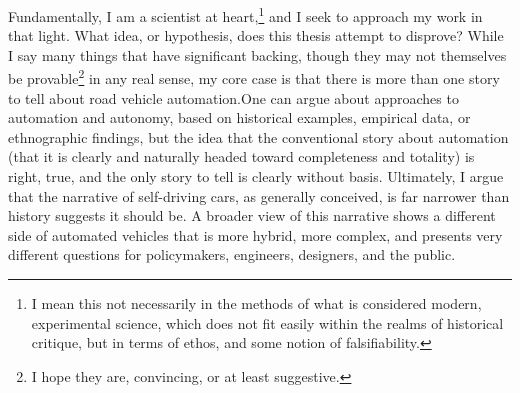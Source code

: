 Fundamentally, I am a scientist at heart,\footnote{I mean this not necessarily in
  the methods of what is considered modern, experimental science,
  which does not fit easily within the realms of historical critique,
  but in terms of ethos, and some notion of falsifiability.} and I seek to approach my
work in that light. What idea, or hypothesis, does this thesis attempt
to disprove? While I say many things that have significant backing,
though they may not themselves be provable\footnote{I hope they are,
  convincing, or at least suggestive.} in any real sense, my core case
is that there is more than one story to tell about road vehicle
automation.\footnotemark One can argue about approaches to automation and autonomy,
based on historical examples, empirical data, or ethnographic
findings, but the idea that the conventional story about automation
(that it is clearly and naturally headed toward completeness and
totality) is right, true, and the only story to tell is clearly
without basis. Ultimately, I argue that the narrative of self-driving cars, as
generally conceived, is far narrower than history suggests it should
be. A broader view of this narrative shows a different side of
automated vehicles that is more hybrid, more complex, and presents
very different questions for policymakers, engineers, designers, and
the public. 



